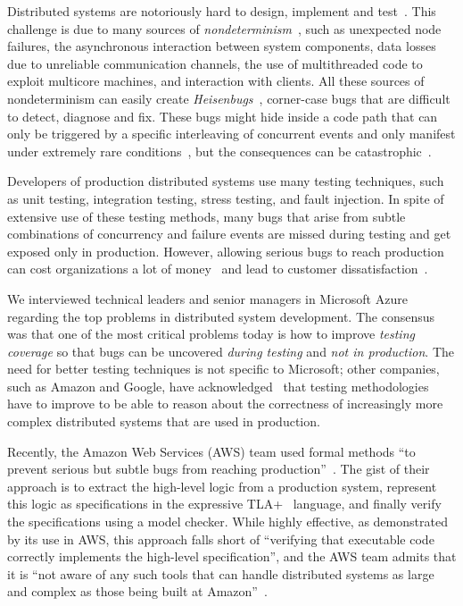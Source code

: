 Distributed systems are notoriously hard to design, implement and test~\cite{cavage2013there, leesatapornwongsa2014samc, gunawi2014cbs, laguna2015debugging, maddox2015test}. This challenge is due to many sources of \emph{nondeterminism}~\cite{chandra2007paxos, henry2009cloud, leesatapornwongsa2016taxdc}, such as unexpected node failures, the asynchronous interaction between system components, data losses due to unreliable communication channels, the use of multithreaded code to exploit multicore machines, and interaction with clients. All these sources of nondeterminism can easily create \emph{Heisenbugs}~\cite{gray1986computers, musuvathi2008finding}, corner-case bugs that are difficult to detect, diagnose and fix. These bugs might hide inside a code path that can only be triggered by a specific interleaving of concurrent events and only manifest under extremely rare conditions~\cite{gray1986computers, musuvathi2008finding}, but the consequences can be catastrophic~\cite{amazon2012aws, google2014outage}.

Developers of production distributed systems use many testing techniques, such as unit testing, integration testing, stress testing, and fault injection. In spite of extensive use of these testing methods, many bugs that arise from subtle combinations of concurrency and failure events are missed during testing and get exposed only in production. However, allowing serious bugs to reach production can cost organizations a lot of money~\cite{tassey2002economic} and lead to customer dissatisfaction~\cite{amazon2012aws, google2014outage}.

We interviewed technical leaders and senior managers in Microsoft Azure regarding the top problems in distributed system development. The consensus was that one of the most critical problems today is how to improve \emph{testing coverage} so that bugs can be uncovered \emph{during testing} and \emph{not in production}. The need for better testing techniques is not specific to Microsoft; other companies, such as Amazon and Google, have acknowledged~\cite{chandra2007paxos,newcombe2015aws} that testing methodologies have to improve to be able to reason about the correctness of increasingly more complex distributed systems that are used in production.

Recently, the Amazon Web Services (AWS) team used formal methods ``to prevent serious but subtle bugs from reaching production''~\cite{newcombe2015aws}. The gist of their approach is to extract the high-level logic from a production system, represent this logic as specifications in the expressive TLA+~\cite{lamport1994temporal} language, and finally verify the specifications using a model checker. While highly effective, as demonstrated by its use in AWS, this approach falls short of ``verifying that executable code correctly implements the high-level specification'', and the AWS team admits that it is ``not aware of any such tools that can handle distributed systems as large and complex as those being built at Amazon''~\cite{newcombe2015aws}.

